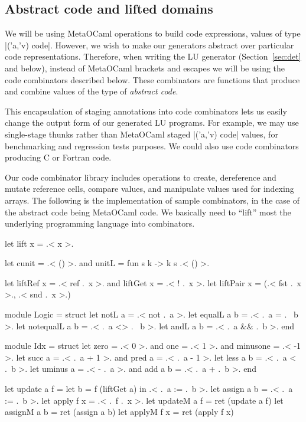 \documentclass{elsart}
\begin{document}
\subsection{Abstract code and lifted domains}\label{sec:lifteddomains}
We will be using MetaOCaml operations to build code expressions, values
of type |('a,'v) code|. However, we wish to make our generators
abstract over particular code representations. Therefore, when writing
the LU generator (Section~\ref{sec:det} and below), instead of
MetaOCaml brackets and escapes we will be using the code combinators
described below. These combinators are functions that produce and
combine values of the type of \emph{abstract code}. 

This encapsulation of staging annotations into code combinators lets
us easily change the output form of our generated LU programs.  For example,
we may use single-stage thunks rather than MetaOCaml staged |('a,'v) code|
values, for benchmarking and regression tests purposes. We could also use
code combinators producing C or Fortran code.

Our code combinator library includes operations to create, dereference
and mutate reference cells, compare values, and manipulate values used
for indexing arrays. The following is the implementation of sample
combinators, in the case of the abstract code being MetaOCaml code. 
We basically need to ``lift'' most the underlying programming language
into combinators.
\begin{code}
let lift x = .< x >.

let cunit = .< () >.  and unitL = fun s k -> k s .< () >.

let liftRef x = .< ref .~x >.  and   liftGet x = .< ! .~x >. 
let liftPair x = (.< fst .~x >., .< snd .~x >.)

module Logic = struct
  let notL a        = .< not .~a >.
  let equalL a b    = .< .~a = .~ b >.
  let notequalL a b = .< .~a <> .~ b >.
  let andL a b     = .< .~a && .~b >. 
end

module Idx = struct
  let zero = .< 0 >. and one = .< 1 >. and minusone = .< -1 >.
  let succ a = .< .~a + 1 >.  and  pred a = .< .~a - 1 >.
  let less a b = .< .~a < .~b >.
  let uminus a = .< - .~a >.  and  add a b = .< .~a + .~b >.
end

let update a f = let b = f (liftGet a) in .< .~a := .~b >.
let assign a b = .< .~a := .~b >.
let apply  f x = .< .~f .~x >.
let updateM a f = ret (update a f)
let assignM a b = ret (assign a b)
let applyM  f x = ret (apply f x)
\end{code}
\end{document}
